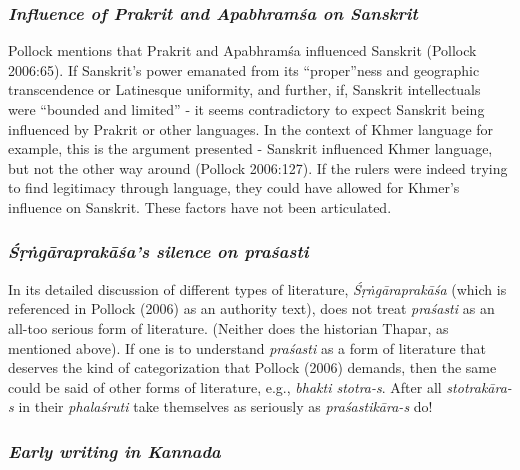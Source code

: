 \subsubsection{{\sl Influence of Prakrit and Apabhramśa on Sanskrit}}

Pollock mentions that Prakrit and Apabhramśa influenced Sanskrit (Pollock 2006:65). If Sanskrit’s power emanated from its “proper”ness and geographic transcendence or Latinesque uniformity, and further, if, Sanskrit intellectuals were “bounded and limited” - it seems contradictory to expect Sanskrit being influenced by Prakrit or other languages. In the context of Khmer language for example, this is the argument presented - Sanskrit influenced Khmer language, but not the other way around (Pollock 2006:127). If the rulers were indeed trying to find legitimacy through language, they could have allowed for Khmer’s influence on Sanskrit. These factors have not been articulated. 

\subsubsection{{\sl Śṛṅgāraprakāśa’s silence on praśasti}}

In its detailed discussion of different types of literature, {\sl Śṛṅgāraprakāśa} (which is referenced in Pollock (2006) as an authority text), does not treat {\sl praśasti} as an all-too serious form of literature. (Neither does the historian Thapar, as mentioned above). If one is to understand {\sl praśasti} as a form of literature that deserves the kind of categorization that Pollock (2006) demands, then the same could be said of other forms of literature, e.g., {\sl bhakti stotra-s}. After all {\sl stotrakāra-s} in their {\sl phalaśruti} take themselves as seriously as {\sl praśastikāra-s} do! 
\vskip -10pt


\subsubsection {{\sl Early writing in Kannada}}
\vskip -4pt

